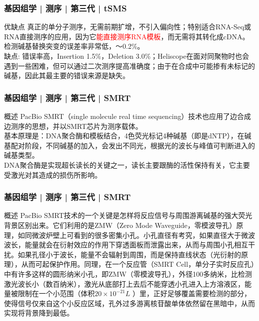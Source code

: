 \begin{frame}
  \frametitle{基因组学 | 测序 | 第三代 | tSMS}
  \begin{block}{优缺点}
    真正的单分子测序，无需前期扩增，不引入偏向性；特别适合RNA-Seq或RNA直接测序的应用，因为它\textcolor{red}{能直接测序RNA模板}，而无需将其转化成cDNA。检测碱基替换突变的误差率非常低，～0.2\%。\\
\vspace{1em}
缺点: 错误率高，Insertion 1.5\%，Deletion 3.0\%；Heliscope在面对同聚物时也会遇到一些困难，但可以通过二次测序提高准确度；由于在合成中可能掺有未标记的碱基，因此其最主要的错误来源是缺失。
  \end{block}
\end{frame}

\begin{frame}
  \frametitle{基因组学 | 测序 | 第三代 | SMRT}
  \begin{block}{概述}
PacBio SMRT（single molecule real time sequencing）技术也应用了边合成边测序的思想，并以SMRT芯片为测序载体。\\
\vspace{1em}
基本原理是：DNA聚合酶和模板结合，4色荧光标记4种碱基（即是dNTP），在碱基配对阶段，不同碱基的加入，会发出不同光，根据光的波长与峰值可判断进入的碱基类型。\\
\vspace{1em}
DNA聚合酶是实现超长读长的关键之一，读长主要跟酶的活性保持有关，它主要受激光对其造成的损伤所影响。
  \end{block}
\end{frame}

\begin{frame}
  \frametitle{基因组学 | 测序 | 第三代 | SMRT}
  \begin{block}{概述}
    PacBio SMRT技术的一个关键是怎样将反应信号与周围游离碱基的强大荧光背景区别出来。它们利用的是ZMW（Zero Mode Waveguide，零模波导孔）原理，如同微波炉壁上可看到的很多密集小孔。小孔直径有考究，如果直径大于微波波长，能量就会在衍射效应的作用下穿透面板而泄露出来，从而与周围小孔相互干扰。如果孔径小于波长，能量不会辐射到周围，而是保持直线状态（光衍射的原理），从而可起保护作用。同理，在一个反应管（SMRT Cell，单分子实时反应孔）中有许多这样的圆形纳米小孔，即ZMW（零模波导孔），外径100多纳米，比检测激光波长小（数百纳米），激光从底部打上去后不能穿透小孔进入上方溶液区，能量被限制在一个小范围（体积$20 \times 10^{-21}L$ ）里，正好足够覆盖需要检测的部分，使得信号仅来自这个小反应区域，孔外过多游离核苷酸单体依然留在黑暗中，从而实现将背景降到最低。
  \end{block}
\end{frame}

